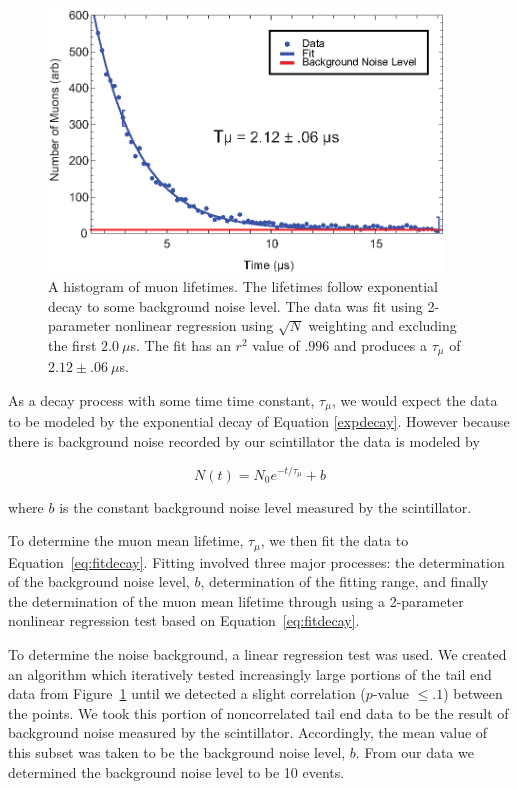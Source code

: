 \begin{figure}[htbp]
\begin{center}
\includegraphics[height=70mm]{./figures/muon_decay.eps}
\caption{A histogram of muon lifetimes. The lifetimes follow exponential decay to some background noise level.  The data was fit using 2-parameter nonlinear regression using $\sqrt{N}$ weighting and excluding the first $2.0~\mu$s.  The fit has an $r^{2}$ value of $.996$ and produces a $\tau_{\mu}$ of $2.12 \pm .06~\mu$s.}
\label{fig:muondecay}
\end{center}
\end{figure}

 As a decay process with some time time constant, $\tau_{\mu}$, we
would expect the data to be modeled by the exponential decay of Equation \eqref{expdecay}.  However because there is background noise recorded by our
scintillator the data is modeled by

\begin{equation}
\label{eq:fitdecay}
N(t) = N_{0} e^{-t/\tau_{\mu}}+b
\end{equation}

where $b$ is the constant background noise level measured by the scintillator. 

To determine the muon mean lifetime, $\tau_{\mu}$, we then fit the
data to Equation~\eqref{eq:fitdecay}.  Fitting involved three major processes: the
determination of the background noise level, $b$, determination of the
fitting range, and finally the determination of the muon mean lifetime
through using a 2-parameter nonlinear regression test based on Equation~\eqref{eq:fitdecay}.

To determine the noise background, a linear regression test was used.
We created an algorithm which iteratively tested increasingly large
portions of the tail end data from Figure~\ref{fig:muondecay} until we detected a
slight correlation ($p$-value $\leq .1$) between the points.  We took
this portion of noncorrelated tail end data to be the result of
background noise measured by the scintillator.  Accordingly, the mean
value of this subset was taken to be the background noise level,
$b$. From our data we determined the background noise level to be 10
events.

